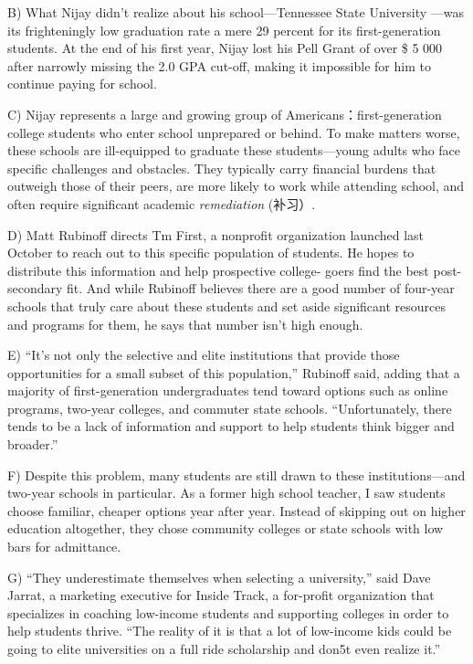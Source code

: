 \documentclass[UTF8,11pt]{ctexart}
\begin{document}
B) What Nijay didn’t realize about his school—Tennessee State University —was its frighteningly low graduation rate a mere 29 percent for its first-generation students. At the end of his first year, Nijay lost his Pell Grant of over \$ 5 000 after narrowly missing the 2.0 GPA cut-off, making it impossible for him to continue paying for school.


C) Nijay represents a large and growing group of Americans：first-generation college students who enter school unprepared or behind. To make matters worse, these schools are ill-equipped to graduate these students—young adults who face specific challenges and obstacles. They typically carry financial burdens that outweigh those of their peers, are more likely to work while attending school, and often require significant academic\textit{ remediation} (补习）.


D) Matt Rubinoff directs Tm First, a nonprofit organization launched last October to reach out to this specific population of students. He hopes to distribute this information and help prospective college- goers find the best post-secondary fit. And while Rubinoff believes there are a good number of four-year schools that truly care about these students and set aside significant resources and programs for them, he says that number isn’t high enough.


E) “It’s not only the selective and elite institutions that provide those opportunities for a small subset of this population,” Rubinoff said, adding that a majority of first-generation undergraduates tend toward options such as online programs, two-year colleges, and commuter state schools. “Unfortunately, there tends to be a lack of information and support to help students think bigger and broader.”


F) Despite this problem, many students are still drawn to these institutions—and two-year schools in particular. As a former high school teacher, I saw students choose familiar, cheaper options year after year. Instead of skipping out on higher education altogether, they chose community colleges or state schools with low bars for admittance.


G) “They underestimate themselves when selecting a university,” said Dave Jarrat, a marketing executive for Inside Track, a for-profit organization that specializes in coaching low-income students and supporting colleges in order to help students thrive. “The reality of it is that a lot of low-income kids could be going to elite universities on a full ride scholarship and don5t even realize it.”
\end{document}
